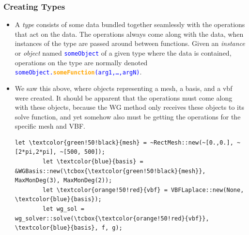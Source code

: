 \documentclass[compress]{beamer}
\begin{document}
\begin{frame}[fragile]
  \frametitle{Creating Types}
  \begin{itemize}[<+->]
    \item A \emph{type} consists of some data bundled together seamlessly with the operations that act on the data.  The operations
      always come along with the data, when instances of the type are passed around between functions.  Given an \emph{instance} or
      \emph{object} named \textcolor{blue}{\small \texttt{someObject}} of a given type where the data is contained, operations on the
      type are normally denoted \textcolor{blue}{\small \texttt{someObject.\textbf{\textcolor{orange}{someFunction}}(arg1,\dots,argN)}}.

    \item We saw this above, where objects representing a mesh, a basis, and a vbf were created. It should be apparent
      that the operations must come along with these objects, because the WG method only receives these objects to its solve function,
      and yet somehow also must be getting the operations for the specific mesh and VBF.
      \begin{Verbatim}[gobble=6, commandchars=\\\{\}, fontsize=\scriptsize, fontfamily=tt]
        let \textcolor{green!50!black}{mesh} = ~RectMesh::new(~[0.,0.], ~[2*pi,2*pi], ~[500, 500]);
        let \textcolor{blue}{basis} = &WGBasis::new(\tcbox{\textcolor{green!50!black}{mesh}}, MaxMonDeg(3), MaxMonDeg(2));
        let \textcolor{orange!50!red}{vbf} = VBFLaplace::new(None, \textcolor{blue}{basis});
        let wg_sol = wg_solver::solve(\tcbox{\textcolor{orange!50!red}{vbf}}, \textcolor{blue}{basis}, f, g);
      \end{Verbatim}
  \end{itemize}
\end{frame}

\end{document}
